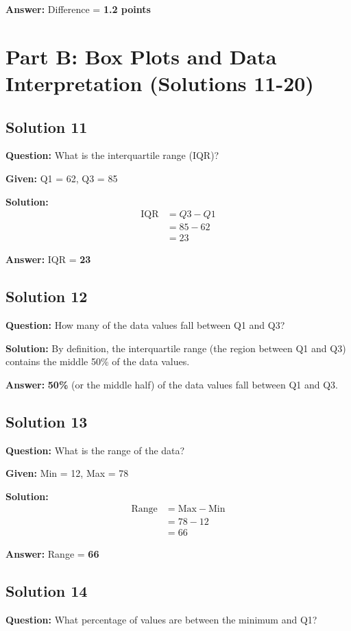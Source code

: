 \documentclass[12pt,a4paper]{article}
\begin{document}
\textbf{Answer:} Difference = \textbf{1.2 points}

\newpage

\section{Part B: Box Plots and Data Interpretation (Solutions 11-20)}

\subsection*{Solution 11}
\textbf{Question:} What is the interquartile range (IQR)?

\textbf{Given:} Q1 = 62, Q3 = 85

\textbf{Solution:}
\begin{align*}
\text{IQR} &= Q3 - Q1 \\
&= 85 - 62 \\
&= 23
\end{align*}

\textbf{Answer:} IQR = \textbf{23}

\subsection*{Solution 12}
\textbf{Question:} How many of the data values fall between Q1 and Q3?

\textbf{Solution:} By definition, the interquartile range (the region between Q1 and Q3) contains the middle 50\% of the data values.

\textbf{Answer:} \textbf{50\%} (or the middle half) of the data values fall between Q1 and Q3.

\subsection*{Solution 13}
\textbf{Question:} What is the range of the data?

\textbf{Given:} Min = 12, Max = 78

\textbf{Solution:}
\begin{align*}
\text{Range} &= \text{Max} - \text{Min} \\
&= 78 - 12 \\
&= 66
\end{align*}

\textbf{Answer:} Range = \textbf{66}

\subsection*{Solution 14}
\textbf{Question:} What percentage of values are between the minimum and Q1?
\end{document}
